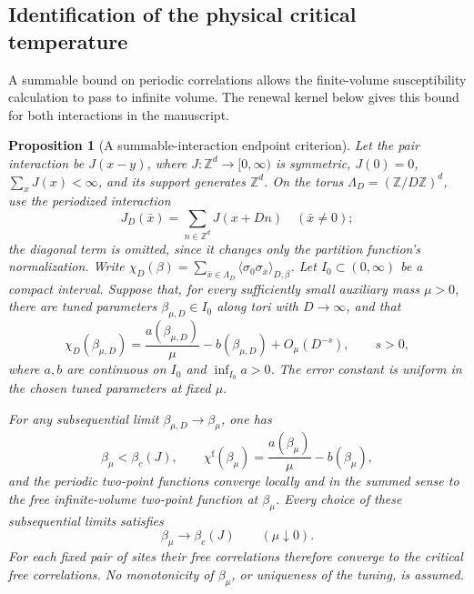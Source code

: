 \documentclass[11pt]{article}
\newtheorem{proposition}{Proposition}[section]
\begin{document}
\subsection{Identification of the physical critical temperature}
\label{frac:sec-endpoint}

A summable bound on periodic correlations allows the finite-volume
susceptibility calculation to pass to infinite volume. The renewal
kernel below gives this bound for both interactions in the manuscript.

\begin{proposition}[A summable-interaction endpoint criterion]
\label{frac:endpoint}
Let the pair interaction be \(J(x-y)\), where
\(J:\mathbb Z^d\to[0,\infty)\) is symmetric, \(J(0)=0\),
\(\sum_x J(x)<\infty\), and its support generates \(\mathbb Z^d\). On the torus
\(\Lambda_D=(\mathbb Z/D\mathbb Z)^d\), use the periodized
interaction
\[
 J_D(\bar x)=\sum_{n\in\mathbb Z^d}J(x+Dn)
 \quad(\bar x\ne0);
\]
the diagonal term is omitted, since it changes only the partition
function's normalization. Write
\(\chi_D(\beta)=\sum_{\bar x\in\Lambda_D}
\langle\sigma_0\sigma_{\bar x}\rangle_{D,\beta}\).
Let \(I_0\subset(0,\infty)\) be a compact interval. Suppose that,
for every sufficiently small auxiliary mass \(\mu>0\), there are
tuned parameters \(\beta_{\mu,D}\in I_0\) along tori with
\(D\to\infty\), and that
\begin{equation}\label{frac:eq-susceptibility-input}
 \chi_D(\beta_{\mu,D})
 =\frac{a(\beta_{\mu,D})}{\mu}-b(\beta_{\mu,D})
       +O_\mu(D^{-s}),\qquad s>0,
\end{equation}
where \(a,b\) are continuous on \(I_0\) and
\(\inf_{I_0}a>0\). The error constant is uniform in the chosen
tuned parameters at fixed \(\mu\).

For any subsequential limit
\(\beta_{\mu,D}\to\beta_\mu\), one has
\[
 \beta_\mu<\beta_c(J),\qquad
 \chi^{\mathrm f}(\beta_\mu)
       =\frac{a(\beta_\mu)}{\mu}-b(\beta_\mu),
\]
and the periodic two-point functions converge locally and in the
summed sense to the free infinite-volume two-point function at
\(\beta_\mu\). Every choice of these subsequential limits satisfies
\[
 \beta_\mu\longrightarrow\beta_c(J)
       \qquad(\mu\downarrow0).
\]
For each fixed pair of sites their free correlations therefore
converge to the critical free correlations. No monotonicity of
\(\beta_\mu\), or uniqueness of the tuning, is assumed.
\end{proposition}
\end{document}
